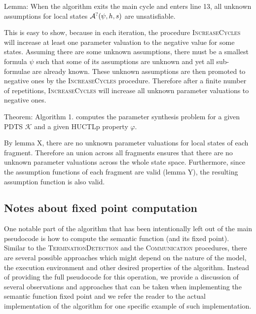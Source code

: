 Lemma: When the algorithm exits the main cycle and enters line 13, all unknown assumptions for local states $\mathcal{A}^?(\psi, h, s)$ are unsatisfiable.

This is easy to show, because in each iteration, the procedure \textsc{IncreaseCycles} will increase at least one parameter valuation to the negative value for some states. Assuming there are some unknown assumptions, there must be a smallest formula $\psi$ such that some of its assumptions are unknown and yet all sub-formulae are already known. These unknown assumptions are then promoted to negative ones by the \textsc{IncreaseCycles} procedure. Therefore after a finite number of repetitions, \textsc{IncreaseCycles} will increase all unknown parameter valuations to negative ones.

Theorem: Algorithm 1. computes the parameter synthesis problem for a given \ac{PDTS} $\mathcal{K}$ and a given \ac{HUCTLp} property $\varphi$.

By lemma X, there are no unknown parameter valuations for local states of each fragment. Therefore an union across all fragments ensures that there are no unknown parameter valuations across the whole state space. Furthermore, since the assumption functions of each fragment are valid (lemma Y), the resulting assumption function is also valid.

\subsection{Notes about fixed point computation}

One notable part of the algorithm that has been intentionally left out of the main pseudocode is how to compute the semantic function (and its fixed point). Similar to the \textsc{TerminationDetection} and the \textsc{Communication} procedures, there are several possible approaches which might depend on the nature of the model, the execution environment and other desired properties of the algorithm.  Instead of providing the full pseudocode for this operation, we provide a discussion of several observations and approaches that can be taken when implementing the semantic function fixed point and we refer the reader to the actual implementation of the algorithm for one specific example of such implementation.

